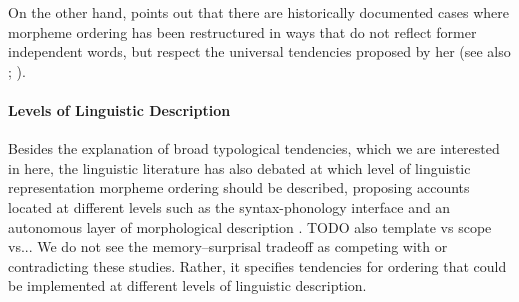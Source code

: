 \documentclass[11pt,letterpaper]{article}
\begin{document}
On the other hand, \citet{bybee-morphology-1985} points out that there are historically documented cases where morpheme ordering has been restructured in ways that do not reflect former independent words, but respect the universal tendencies proposed by her (see also \citet{mithun2000the, haspelmath1993the, mithun1995affixation}; \citet[Section 15]{rice2000morpheme}).


\paragraph{Levels of Linguistic Description}
Besides the explanation of broad typological tendencies, which we are interested in here, the linguistic literature has also debated at which level of linguistic representation morpheme ordering should be described, proposing accounts located at different levels such as the syntax-phonology interface \citep{baker1985the} and an autonomous layer of morphological description \citep{hyman2003suffix}.
TODO also template vs scope vs...
We do not see the memory--surprisal tradeoff as competing with or contradicting these studies.
Rather, it specifies tendencies for ordering that could be implemented at different levels of linguistic description.







\end{document}
